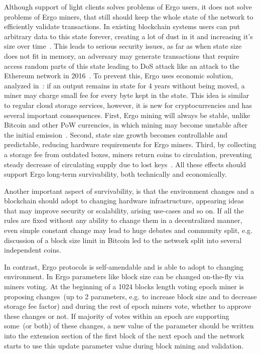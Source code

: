Although support of light clients solves problems of Ergo users, it does not solve problems
of Ergo miners, that still should keep the whole state of the network to efficiently validate
transactions.
In existing blockchain systems users can put arbitrary data to this state forever,
creating a lot of dust in it and increasing it's size over time~\cite{bitcoin utxo dust}.
This leads to serious security issues, as far as when state size does not fit in memory,
an adversary may generate transactions that require access random parts of this state
leading to DoS attack like an attack to the Ethereum network in 2016~\cite{??}.
To prevent this, Ergo uses economic solution, analyzed in~\cite{chepurnoy2018systematic}: if an
output remains in state for 4 years without being moved, a miner may charge small fee for every
byte kept in the state.
This idea is similar to regular cloud storage services, however, it is new for
cryptocurrencies and has several important consequences.
First, Ergo mining will always be stable, unlike Bitcoin and other PoW currencies, in which mining may become unstable after the
initial emission~\cite{carlsten2016instability}.
Second, state size growth becomes controllable and predictable, reducing hardware requirements for Ergo miners.
Third, by collecting a storage fee from outdated boxes, miners return coins to circulation, preventing steady decrease
of circulating supply due to lost keys~\cite{wsj2018}.
All these effects should support Ergo long-term survivability, both technically and economically.

Another important aspect of survivability, is that the environment changes and a blockchain should
adopt to changing hardware infrastructure, appearing ideas that may improve security or
scalability, arising use-cases and so on.
If all the rules are fixed without any ability to change them in a decentralized manner, even
simple constant change may lead to huge debates and community split, e.g. discussion of a block
size limit in Bitcoin led to the network split into several independent coins.

In contrast, Ergo protocols is self-amendable and is able to adopt to changing environment.
In Ergo parameters like block size can be changed on-the-fly via miners voting.
At the beginning of a 1024 blocks length voting epoch miner is proposing changes~(up to 2 parameters,
e.g. to increase block size and to decrease storage fee factor) and during the rest of epoch miners
vote, whether to approve these changes or not.
If majority of votes within an epoch are supporting some~(or both) of these changes, a new value of the
parameter should be written into the extension section of the first block of the next epoch and the
network starts to use this update parameter value during block mining and validation.

